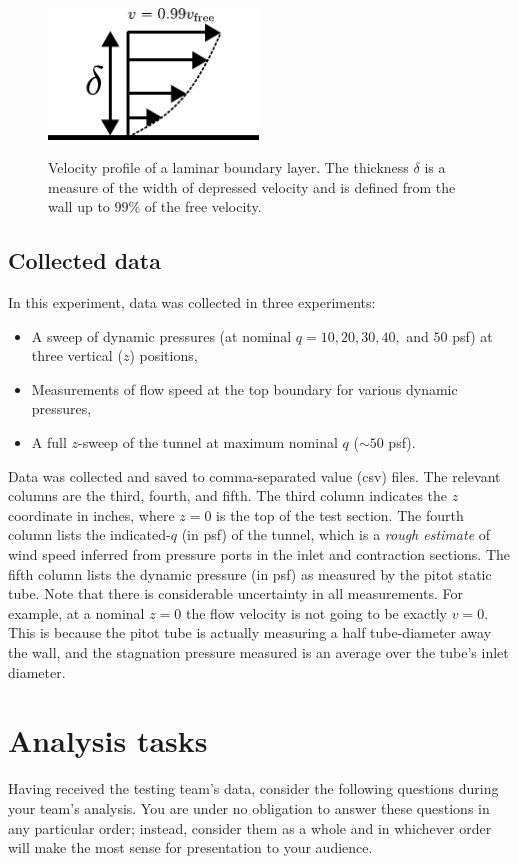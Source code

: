 \documentclass[12pt]{article}
\begin{document}
\begin{figure}[h]
  \centering
  \includegraphics[width=0.5\textwidth]{boundary_layer}\\
  \caption{Velocity profile of a laminar boundary layer. The thickness $\delta$ is a measure of the width of depressed velocity and is defined from the wall up to $99\%$ of the free velocity.}\label{boundary}
\end{figure}

\subsection{Collected data}
In this experiment, data was collected in three experiments:
\begin{itemize}
\item A sweep of dynamic pressures (at nominal $q=10, 20, 30, 40,$ and $50$ psf) at three vertical ($z$) positions,
\item Measurements of flow speed at the top boundary for various dynamic pressures,
\item A full $z$-sweep of the tunnel at maximum nominal $q$ ($\sim 50$ psf).
\end{itemize}
Data was collected and saved to comma-separated value (csv) files. The relevant columns are the third, fourth, and fifth. The third column indicates the $z$ coordinate in inches, where $z=0$ is the top of the test section. The fourth column lists the indicated-$q$ (in psf) of the tunnel, which is a \textit{rough estimate} of wind speed inferred from pressure ports in the inlet and contraction sections. The fifth column lists the dynamic pressure (in psf) as measured by the pitot static tube. Note that there is considerable uncertainty in all measurements. For example, at a nominal $z=0$ the flow velocity is not going to be exactly $v=0$. This is because the pitot tube is actually measuring a half tube-diameter away the wall, and the stagnation pressure measured is an average over the tube's inlet diameter.

\section{Analysis tasks}
Having received the testing team's data, consider the following questions during your team's analysis. You are under no obligation to answer these questions in any particular order; instead, consider them as a whole and in whichever order will make the most sense for presentation to your audience.
\end{document}

